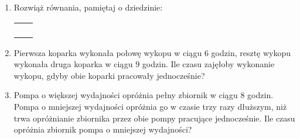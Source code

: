 \documentclass[12pt,a4paper]{article}
\begin{document}
\begin{enumerate}[1.]
\begin{enumerate}[a)]
\begin{tabular}{p{7cm} p{7cm}}
				\item $\frac{x-1}{x-3}-\frac{x+1}{x-3}+\frac{x-4}{x-9}= $& \item $\frac{x-2}{x^2-4x}+\frac{x^2-1}{x^2-8x+16}-\frac{1}{2x}= $ \\
				\item $\frac{2x-1}{2x+1}+\frac{2-3x}{2x-1}= $& \item $\frac{1}{x-2}-\frac{1}{x}-\frac{1}{x^2-2x}= $ \\
				\item $\frac{5x}{x^2-6x+9}+\frac{4}{x-3}-\frac{1}{x^+3x}= $& \item $\frac{x-1}{x}-\frac{3}{x^2}+\frac{1}{x+1}= $ \\
		\end{tabular} \end{enumerate}	
		
		\normalsize
		\item Rozwiąż równania, pamiętaj o dziedzinie:
		\Large
		\begin{enumerate}[a)] \begin{tabular}{p{7cm} p{7cm}} 
				\item $\frac{x+1}{x-5}=\frac{x-2}{x+1} $& \vspace{0.4cm} \item $\frac{2x+3}{4x-5}=\frac{4x+5}{8x-7} $ \\
				\item $\frac{x^3-2x^2-5x+10}{2x-10}=0 $& \item $\frac{x^2+5}{3x^2-6x}=0 $ \\
				\item $\frac{3}{x^2-4}=1 $& \item $\frac{2x+3}{4x-5}=\frac{4x+5}{8x-7} $ \\
				\item $\frac{x}{x-3}+\frac{4}{x-3}=2x-2 $& \item $\frac{x+1}{x-3}+\frac{x-2}{x+1}=\frac{x^2+x+12}{x^2-2x-3} $  \\
		\end{tabular} \end{enumerate}	
		
		\normalsize
		\item Pierwsza koparka wykonała połowę wykopu w ciągu 6 godzin, resztę wykopu wykonała druga koparka w ciągu 9 godzin. Ile czasu zajęłoby wykonanie wykopu, gdyby obie koparki pracowały jednocześnie?
		
		\item Pompa o większej wydajności opróżnia pełny zbiornik w ciągu 8 godzin. Pompa o mniejszej wydajności opróżnia go w czasie trzy razy dłuższym, niż trwa opróżnianie zbiornika przez obie pompy pracujące jednocześnie. Ile czasu opróżnia zbiornik pompa o mniejszej wydajności?
		
		
		
	\end{enumerate}
\end{document}
